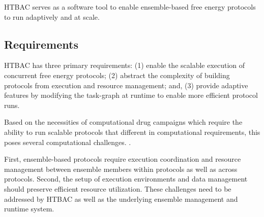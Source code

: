 HTBAC serves as a software tool to enable ensemble-based free energy
protocols to run adaptively and at scale.





\subsection{Requirements}

HTBAC has three primary requirements: (1) enable the scalable execution of
concurrent free energy protocols; (2) abstract the complexity of building
protocols from execution and resource management; and, (3) provide adaptive
features by modifying the task-graph at runtime to enable more efficient
protocol runs.



Based on the necessities of computational drug campaigns which require the
ability to run scalable protocols that different in computational requirements, 
this poses several computational challenges. 
.

First, ensemble-based protocols require execution coordination and resource 
management between ensemble members within protocols as well as across 
protocols. Second, the setup of execution environments and data management 
should preserve efficient resource utilization. These challenges need to be 
addressed by HTBAC as well as the underlying ensemble management and runtime 
system. 

